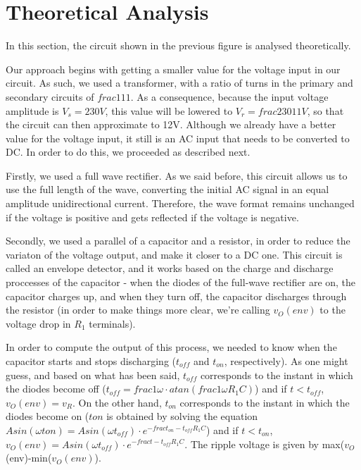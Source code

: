 \section{Theoretical Analysis}
\label{sec:theoretical}

\par In this section, the circuit shown in the previous figure is analysed theoretically.
\par Our approach begins with getting a smaller value for the voltage input in our circuit. As such, we used a transformer, with a ratio of turns in the primary and secondary circuits of $frac{1}{11}$. As a consequence, because the input voltage amplitude is $V_s=230V$, this value will be lowered to $V_r=frac{230}{11}V$, so that the circuit can then approximate to 12V. Although we already have a better value for the voltage input, it still is an AC input that needs to be converted to DC. In order to do this, we proceeded as described next.
\par Firstly, we used a full wave rectifier. As we said before, this circuit allows us to use the full length of the wave, converting the initial AC signal in an equal amplitude unidirectional current. Therefore, the wave format remains unchanged if the voltage is positive and gets reflected if the voltage is negative.
\par Secondly, we used a parallel of a capacitor and a resistor, in order to reduce the variaton of the voltage output, and make it closer to a DC one. This circuit is called an envelope detector, and it works based on the charge and discharge proccesses of the capacitor - when the diodes of the full-wave rectifier are on, the capacitor charges up, and when they turn off, the capacitor discharges through the resistor (in order to make things more clear, we're calling $v_O(env)$ to the voltage drop in $R_1$ terminals).
\par In order to compute the output of this process, we needed to know when the capacitor starts and stops discharging ($t_{off}$ and $t_{on}$, respectively). As one might guess, and based on what has been said, $t_{off}$ corresponds to the instant in which the diodes become off ($t_{off}=frac{1}{\omega} \cdot atan(frac{1}{\omega R_1C})$) and if $t<t_{off}$, $v_O(env)=v_R$. On the other hand, $t_{on}$ corresponds to the instant in which the diodes become on ($t{on}$ is obtained by solving the equation $Asin(\omega t{on})=Asin(\omega t_{off}) \cdot e^{-frac{t_{on}-t_{off}}{R_1C}}$) and if $t<t_{on}$, $v_O(env)=Asin(\omega t_{off}) \cdot e^{-frac{t-t_{off}}{R_1C}}$. The ripple voltage is given by max($v_O$(env)-min($v_O(env)$).


